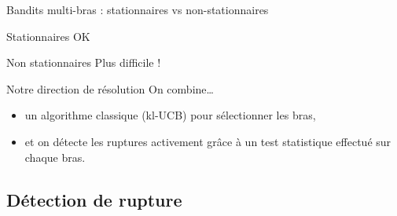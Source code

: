 \documentclass[11pt,french,ignorenonframetext,]{beamer}
\begin{document}
\begin{frame}{Bandits multi-bras : stationnaires vs non-stationnaires}

  \begin{block}{Stationnaires}
    OK
  \end{block}

  \pause

  \begin{alertblock}{Non stationnaires}
    Plus difficile !
  \end{alertblock}

  \pause

  \begin{block}{Notre direction de résolution}
    On combine\ldots{}
    \begin{itemize}
      \item un \alert{algorithme classique} (kl-UCB) pour sélectionner les bras,
      \item et \alert{on détecte les ruptures activement grâce à un test statistique} effectué sur chaque bras.
    \end{itemize}
  \end{block}

\end{frame}


\subsection{\hfill{}Détection de rupture\hfill{}}
\end{document}
